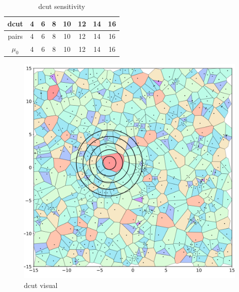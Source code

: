 \begin{table}[ht]
    \caption{dcut sensitivity}
\centering %
\begin{tabular}{c c c c c c c c} %
\hline\hline %
dcut & 4 & 6 & 8 & 10 & 12 & 14 & 16 \\ [0.5ex] %
\hline %
 pairs & 4 & 6 & 8 & 10 & 12 & 14 & 16 \\ %
$\mu_{0}$ & 4 & 6 & 8 & 10 & 12 & 14 & 16 \\ [1ex] %
\hline %
\end{tabular}
\label{table:dcut-sense} %
\end{table}

\begin{figure}
  \center
  \includegraphics[width=\linewidth, height=\textheight,keepaspectratio]{figures/crystalline_voronoi_d_cut_circles.png} 
  \caption{dcut visual}
  \label{fig:dcut}
\end{figure}


